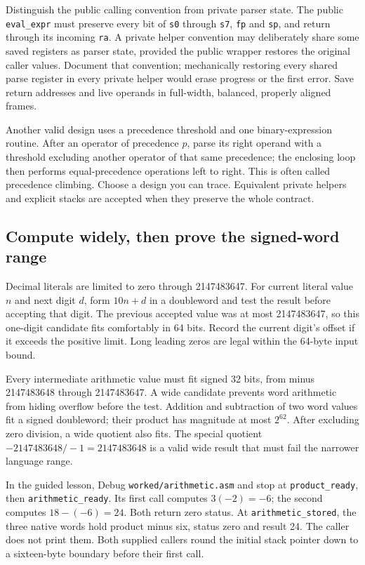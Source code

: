 Distinguish the public calling convention from private parser state. The public
\texttt{eval\_expr} must preserve every bit of \texttt{s0} through \texttt{s7},
\texttt{fp} and \texttt{sp}, and return through its incoming \texttt{ra}. A private
helper convention may deliberately share some saved registers as parser state,
provided the public wrapper restores the original caller values. Document that
convention; mechanically restoring every shared parse register in every private
helper would erase progress or the first error. Save return addresses and live
operands in full-width, balanced, properly aligned frames.

Another valid design uses a precedence threshold and one binary-expression
routine. After an operator of precedence $p$, parse its right operand with a
threshold excluding another operator of that same precedence; the enclosing
loop then performs equal-precedence operations left to right. This is often
called precedence climbing. Choose a design you can trace. Equivalent private
helpers and explicit stacks are accepted when they preserve the whole contract.

\subsection*{Compute widely, then prove the signed-word range}

Decimal literals are limited to zero through 2147483647. For current literal
value $n$ and next digit $d$, form $10n+d$ in a doubleword and test the result
before accepting that digit. The previous accepted value was at most 2147483647,
so this one-digit candidate fits comfortably in 64 bits. Record the current
digit's offset if it exceeds the positive limit. Long leading zeros are legal
within the 64-byte input bound.

Every intermediate arithmetic value must fit signed 32 bits, from minus
2147483648 through 2147483647. A wide candidate prevents word arithmetic from
hiding overflow before the test. Addition and subtraction of two word values
fit a signed doubleword; their product has magnitude at most \(2^{62}\).
After excluding zero division, a wide quotient also fits. The special quotient
\(-2147483648/-1=2147483648\) is a valid wide result that must fail the narrower
language range.

In the guided lesson, Debug \texttt{worked/arithmetic.asm} and stop at \texttt{product\_ready}, then
\texttt{arithmetic\_ready}. Its first call computes \(3(-2)=-6\); the second
computes \(18-(-6)=24\). Both return zero status. At
\texttt{arithmetic\_stored}, the three native words hold product minus six,
status zero and result 24. The caller does not print them. Both supplied callers round the initial stack
pointer down to a sixteen-byte boundary before their first call.

